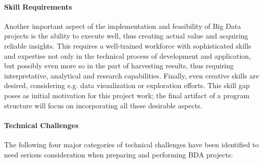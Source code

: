\paragraph{Skill Requirements}
Another important aspect of the implementation and feasibility of Big Data projects is the ability to execute well, thus creating actual value and acquiring reliable insights. This requires a well-trained workforce with sophisticated skills and expertise not only in the technical process of development and application, but possibly even more so in the part of harvesting results, thus requiring interpretative, analytical and research capabilities. Finally, even creative skills are desired, considering e.g. data visualization or exploration efforts. This skill gap poses as initial motivation for this project work; the final artifact of a program structure will focus on incorporating all these desirable aspects.

\paragraph{Technical Challenges}
The following four major categories of technical challenges have been identified to need serious consideration when preparing and performing \ac{BDA} projects:

